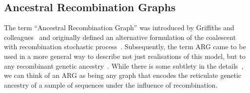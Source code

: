 \documentclass{article}
\begin{document}


\subsection{Ancestral Recombination Graphs}
The term ``Ancestral Recombination Graph'' was introduced by
Griffiths and colleagues~\citep{Griffiths1991-two,Griffiths1998-ancestral}
and originally defined an alternative formulation of the coalescent
with recombination stochastic process~\citep{Hudson1983-properties}.
Subsequently, the term ARG came to be used in a more general way to
describe not just realisations of this model, but to any
recombinant genetic ancestry~\citep{Minichiello2006-mapping}.
While there is some subtlety in the details~\citep{Wong2023-efficient},
we can think of an ARG as being any graph that encodes the
reticulate genetic ancestry of a sample of sequences under
the influence of recombination.
\end{document}
